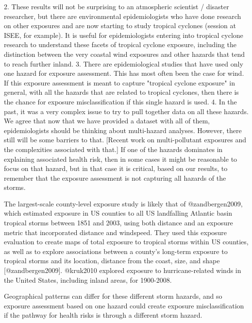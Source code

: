  
2. These results will not be surprising to an atmospheric scientist / disaster
researcher, but there are environmental epidemiologists who have done research
on other exposures and are now starting to study tropical cyclones (session at
ISEE, for example). It is useful for epidemiologists entering into tropical
cyclone research to understand these facets of tropical cyclone exposure,
including the distinction between the very coastal wind exposures and other
hazards that tend to reach further inland.
3. There are epidemiological studies that have used only one hazard for exposure
assessment. This has most often been the case for wind. If this exposure
assessment is meant to capture "tropical cyclone exposure" in general, with all
the hazards that are related to tropical cyclones, then there is the chance for
exposure misclassification if this single hazard is used.
4. In the past, it was a very complex issue to try to pull together data on all
these hazards. We agree that now that we have provided a dataset with all of
them, epidemiologists should be thinking about multi-hazard analyses. However,
there still will be some barriers to that. [Recent work on multi-pollutant
exposures and the complexities associated with that.] If one of the hazards
dominates in explaining associated health risk, then in some cases it might be
reasonable to focus on that hazard, but in that case it is critical, based on
our results, to remember that the exposure assessment is not capturing all
hazards of the storms.


The largest-scale county-level exposure study is likely that of @zandbergen2009,
which estimated exposure in US counties to all US landfalling Atlantic basin
tropical storms between 1851 and 2003, using both distance and an exposure
metric that incorporated distance and windspeed. They used this exposure
evaluation to create maps of total exposure to tropical storms within US
counties, as well as to explore associations between a county's long-term
exposure to tropical storms and its location, distance from the coast, size, and
shape [@zandbergen2009]. @kruk2010 explored exposure to hurricane-related winds
in the United States, including inland areas, for 1900-2008.

Geographical patterns can differ for these different
storm hazards, and so exposure assessment based on one hazard could create
exposure misclassification if the pathway for health risks is through a
different storm hazard.   


